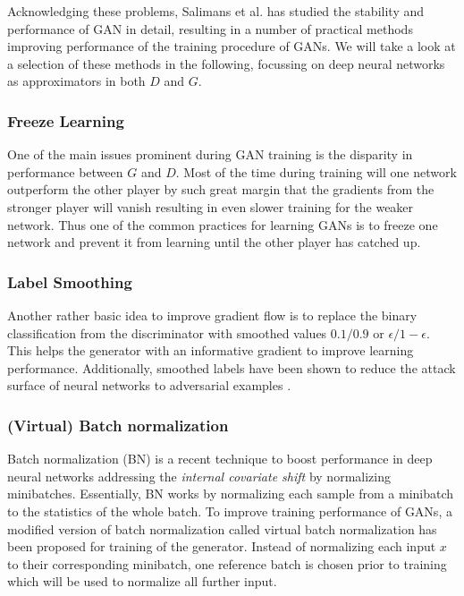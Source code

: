 Acknowledging these problems, Salimans et al.\cite{improved_gan:2016} has studied the stability and performance of GAN in detail, resulting in a number of practical methods improving performance of the training procedure of GANs.
We will take a look at a selection of these methods in the following, focussing on deep neural networks as approximators in both $D$ and $G$.

\subsubsection{Freeze Learning}
\label{ssub:gan_freeze_learning}
One of the main issues prominent during GAN training is the disparity in performance between $G$ and $D$.
Most of the time during training will one network outperform the other player by such great margin that the gradients from the stronger player will vanish resulting in even slower training for the weaker network.
Thus one of the common practices\cite{improved_gan:2016}\cite{dcgan:2015} for learning GANs is to freeze one network and prevent it from learning until the other player has catched up.


\subsubsection{Label Smoothing \cite{improved_gan:2016}}
\label{ssub:gan_label_smoothing}
Another rather basic idea to improve gradient flow is to replace the binary classification from the discriminator with smoothed values $0.1/0.9$ or $\epsilon/1-\epsilon$.
This helps the generator with an informative gradient to improve learning performance.
Additionally, smoothed labels have been shown to reduce the attack surface of neural networks to adversarial examples \cite{adv_examples:2016}.


\subsubsection{(Virtual) Batch normalization}
\label{ssub:gan_batch_norm}
Batch normalization (BN) \cite{batch_norm:2015} is a recent technique to boost performance in deep neural networks addressing the \emph{internal covariate shift} by normalizing minibatches.
Essentially, BN works by normalizing each sample from a minibatch to the statistics of the whole batch.
To improve training performance of GANs, a modified version of batch normalization called virtual batch normalization has been proposed \cite{improved_gan:2016} for training of the generator.
Instead of normalizing each input $x$ to their corresponding minibatch, one reference batch is chosen prior to training which will be used to normalize all further input.

